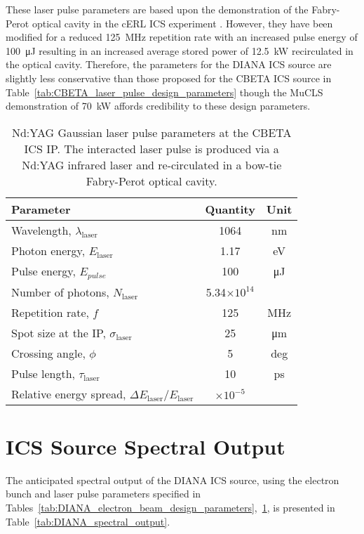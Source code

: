 \documentclass[../main.tex]{subfiles}
\begin{document}
These laser pulse parameters are based upon the demonstration of the Fabry-Perot optical cavity in the cERL ICS experiment \cite{akagi2016narrow}. However, they have been modified for a reduced 125~\si{\mega\hertz} repetition rate with an increased pulse energy of 100~\si{\micro\joule} resulting in an increased average stored power of 12.5~\si{\kilo\watt} recirculated in the optical cavity. Therefore, the parameters for the DIANA ICS source are slightly less conservative than those proposed for the CBETA ICS source in Table~\ref{tab:CBETA_laser_pulse_design_parameters} though the MuCLS demonstration of 70~\si{\kilo\watt} \cite{eggl2016munich} affords credibility to these design parameters.

\begin{table}[H]
\centering
\caption{Nd:YAG Gaussian laser pulse parameters at the CBETA ICS IP. The interacted laser pulse is produced via a Nd:YAG infrared laser and re-circulated in a bow-tie Fabry-Perot optical cavity.}
\begin{tabular}{lcc}
\hline\hline
Parameter & Quantity & Unit \\
\hline
Wavelength, $\lambda_\textrm{laser}$ & 1064 & \si{\nano\meter}\\
Photon energy, $E_\textrm{laser}$ & 1.17 & \si{\electronvolt}\\
Pulse energy, $E_{pulse}$  & 100 & \si{\micro\joule}\\
Number of photons, $N_{\textrm{laser}}$ & 5.34$\times 10^{14}$ & \\ 
Repetition rate, $f$ & 125 & \si{\mega\hertz}\\
Spot size at the IP, $\sigma_\textrm{laser}$ & 25 & \si{\micro\meter}\\
Crossing angle, $\phi$ & 5 & deg \\
Pulse length, $\tau_{\mathrm{laser}}$  & 10 & \si{\pico\second}\\
Relative energy spread, $\Delta E_\textrm{laser}/E_\textrm{laser}$ & $\times 10^{-5}$ &   \\
\hline\hline
\end{tabular}
\label{tab:DIANA_laser_pulse_design_parameters}
\end{table}

\section{ICS Source Spectral Output}

The anticipated spectral output of the DIANA ICS source, using the electron bunch and laser pulse parameters specified in Tables~\ref{tab:DIANA_electron_beam_design_parameters},~\ref{tab:DIANA_laser_pulse_design_parameters}, is presented in Table~\ref{tab:DIANA_spectral_output}. 
\end{document}
